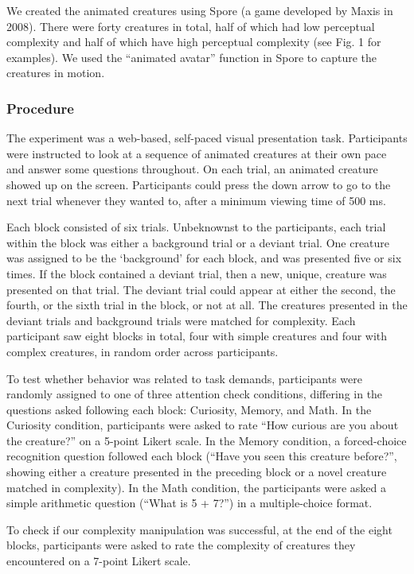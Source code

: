\documentclass[10pt, letterpaper]{article}
\begin{document}
We created the animated creatures using Spore (a game developed by Maxis
in 2008). There were forty creatures in total, half of which had low
perceptual complexity and half of which have high perceptual complexity
(see Fig. 1 for examples). We used the ``animated avatar'' function in
Spore to capture the creatures in motion.

\hypertarget{procedure}{%
\subsubsection{Procedure}\label{procedure}}

The experiment was a web-based, self-paced visual presentation task.
Participants were instructed to look at a sequence of animated creatures
at their own pace and answer some questions throughout. On each trial,
an animated creature showed up on the screen. Participants could press
the down arrow to go to the next trial whenever they wanted to, after a
minimum viewing time of 500 ms.

Each block consisted of six trials. Unbeknownst to the participants,
each trial within the block was either a background trial or a deviant
trial. One creature was assigned to be the `background' for each block,
and was presented five or six times. If the block contained a deviant
trial, then a new, unique, creature was presented on that trial. The
deviant trial could appear at either the second, the fourth, or the
sixth trial in the block, or not at all. The creatures presented in the
deviant trials and background trials were matched for complexity. Each
participant saw eight blocks in total, four with simple creatures and
four with complex creatures, in random order across participants.

To test whether behavior was related to task demands, participants were
randomly assigned to one of three attention check conditions, differing
in the questions asked following each block: Curiosity, Memory, and
Math. In the Curiosity condition, participants were asked to rate ``How
curious are you about the creature?'' on a 5-point Likert scale. In the
Memory condition, a forced-choice recognition question followed each
block (``Have you seen this creature before?'', showing either a
creature presented in the preceding block or a novel creature matched in
complexity). In the Math condition, the participants were asked a simple
arithmetic question (``What is 5 + 7?'') in a multiple-choice format.

To check if our complexity manipulation was successful, at the end of
the eight blocks, participants were asked to rate the complexity of
creatures they encountered on a 7-point Likert scale.
\end{document}
